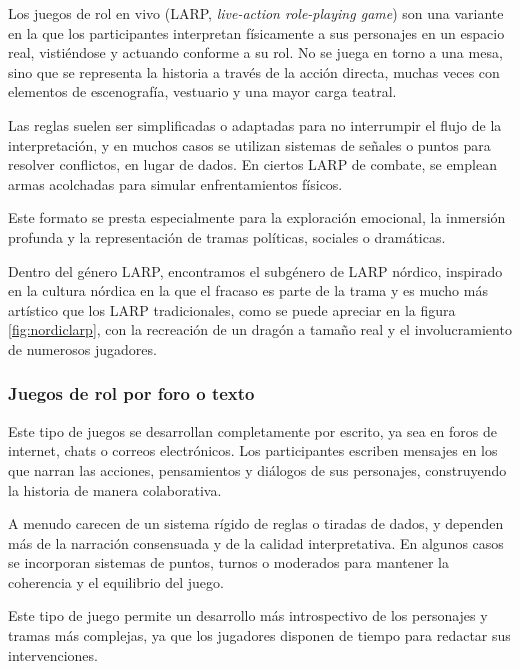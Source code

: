 Los juegos de rol en vivo (LARP, \textit{live-action role-playing game}) son una variante en la que los participantes interpretan físicamente a sus personajes en un espacio real, vistiéndose y actuando conforme a su rol. No se juega en torno a una mesa, sino que se representa la historia a través de la acción directa, muchas veces con elementos de escenografía, vestuario y una mayor carga teatral.

\medskip

Las reglas suelen ser simplificadas o adaptadas para no interrumpir el flujo de la interpretación, y en muchos casos se utilizan sistemas de señales o puntos para resolver conflictos, en lugar de dados. En ciertos LARP de combate, se emplean armas acolchadas para simular enfrentamientos físicos.

\medskip

Este formato se presta especialmente para la exploración emocional, la inmersión profunda y la representación de tramas políticas, sociales o dramáticas.

\medskip

Dentro del género LARP, encontramos el subgénero de LARP nórdico, inspirado en la cultura nórdica en la que el fracaso es parte de la trama y es mucho más artístico que los LARP tradicionales, como se puede apreciar en la figura \ref{fig:nordiclarp}, con la recreación de un dragón a tamaño real y el involucramiento de numerosos jugadores.

\subsubsection{Juegos de rol por foro o texto}
Este tipo de juegos se desarrollan completamente por escrito, ya sea en foros de internet, chats o correos electrónicos. Los participantes escriben mensajes en los que narran las acciones, pensamientos y diálogos de sus personajes, construyendo la historia de manera colaborativa.

\medskip

A menudo carecen de un sistema rígido de reglas o tiradas de dados, y dependen más de la narración consensuada y de la calidad interpretativa. En algunos casos se incorporan sistemas de puntos, turnos o moderados para mantener la coherencia y el equilibrio del juego.

\medskip

Este tipo de juego permite un desarrollo más introspectivo de los personajes y tramas más complejas, ya que los jugadores disponen de tiempo para redactar sus intervenciones.

